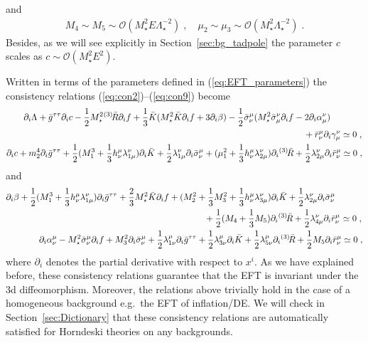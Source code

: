 \documentclass[a4paper,11pt]{article}
\numberwithin{equation}{section}
\begin{document}
and 
\begin{align}
M_4 \sim M_5 \sim \mathcal{O}(M_\star^2 E \Lambda_\star^{-2}) \;, \quad \mu_2 \sim \mu_3 \sim \mathcal{O}(M_\star^2 \Lambda_\star^{-2}) \;.
\end{align}
Besides, as we will see explicitly in Section~\ref{sec:bg_tadpole} the parameter $c$ scales as $c \sim \mathcal{O}(M_\star^2 E^2)$.

Written in terms of the parameters defined in (\ref{eq:EFT_parameters}) the consistency relations (\ref{eq:con2})--(\ref{eq:con9}) become
\begin{align}
\partial_i\Lambda + \bar{g}^{\tau\tau}\partial_i c - \frac{1}{2}M^2_\star {}^{(3)}\!\bar{R} \partial_i f + \frac{1}{3}\bar{K}(M^2_\star \bar{K}\partial_i f + 3\partial_i\beta) - \frac{1}{2} \bar{\sigma}^\mu_\nu (M^2_\star \bar{\sigma}^\nu_\mu \partial_i f & - 2\partial_i\alpha^\nu_\mu) \nonumber \\
&\hspace{4mm}+ \bar{r}^\mu_\nu\partial_i\gamma^{\nu}_\mu \simeq 0 \;, \label{eq:con_EFT1} \\
\partial_i c + m_2^4 \partial_i \bar{g}^{\tau\tau} + \frac{1}{2}(M_1^3 + \frac{1}{3} h^\mu_\nu \lambda_{1\mu}^\nu) \partial_i\bar{K} + \frac{1}{2}\lambda_{1\mu}^\nu \partial_i\bar{\sigma}^\mu_\nu  + (\mu_1^2 + \frac{1}{3}h^\mu_\nu \lambda_{2\mu}^\nu )\partial_i{}^{(3)}\!\bar{R} &+ \frac{1}{2}\lambda_{2\mu}^\nu \partial_i\bar{r}^\mu_\nu \simeq 0 \;, 
\end{align}
and
\begin{align}
\partial_i\beta + \frac{1}{2}(M_1^3 + \frac{1}{3}h^\mu_\nu \lambda^\nu_{1\mu})\partial_i \bar{g}^{\tau\tau} + \frac{2}{3}M_\star^2 \bar{K} \partial_i f + (M_2^2 &+ \frac{1}{3} M_3^2 + \frac{1}{3} h^\mu_\nu \lambda_{3 \mu}^\nu) \partial_i \bar{K} + \frac{1}{2} \lambda_{2 \mu}^\nu \partial_i\bar{\sigma}_\nu^\mu \nonumber \\ & \hspace{3mm} + \frac{1}{2} (M_4 + \frac{1}{3}M_5)\partial_i{}^{(3)}\!\bar{R} + \frac{1}{2}\lambda_{4 \mu}^\nu \partial_i\bar{r}^\mu_\nu \hspace{0.2mm} \simeq 0 \;, \\
\partial_i\alpha^\mu_\nu - M_\star^2 \bar{\sigma}^\mu_\nu \partial_i f + M_3^2 \partial_i\bar{\sigma}^\mu_\nu + \frac{1}{2} \lambda_{1 \nu}^\mu \partial_i\bar{g}^{\tau\tau} &+ \frac{1}{2} \lambda_{3 \nu}^\mu \partial_i\bar{K} + \frac{1}{2} \lambda_{5 \nu}^\mu \partial_i{}^{(3)}\!\bar{R} + \frac{1}{2}M_5 \partial_i\bar{r}^\mu_\nu \simeq 0 \label{eq:con_EFT2} \;, 
\end{align}
where $\partial_i$ denotes the partial derivative with respect to $x^i$. As we have explained before, these consistency relations guarantee that the EFT is invariant under the 3d diffeomorphism. Moreover, the relations above trivially hold in the case of a homogeneous background e.g.~the EFT of inflation/DE. We will check in Section~\ref{sec:Dictionary} that these consistency relations are automatically satisfied for Horndeski theories on any backgrounds. 
\end{document}
